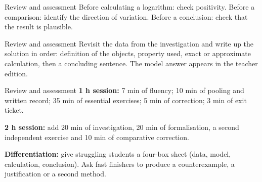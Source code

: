 \documentclass[aspectratio=169,10pt]{beamer}
\begin{document}
\begin{frame}{Review and assessment}
Before calculating a logarithm: check positivity. Before a comparison: identify the direction of variation. Before a conclusion: check that the result is plausible.
\end{frame}
\begin{frame}{Review and assessment}
Revisit the data from the investigation and write up the solution in order: definition of the objects, property used, exact or approximate calculation, then a concluding sentence. The model answer appears in the teacher edition.
\end{frame}
\begin{frame}{Review and assessment}
\textbf{1 h session:} 7 min of fluency; 10 min of pooling and written record; 35 min of essential exercises; 5 min of correction; 3 min of exit ticket.

\textbf{2 h session:} add 20 min of investigation, 20 min of formalisation, a second independent exercise and 10 min of comparative correction.

\textbf{Differentiation:} give struggling students a four-box sheet (data, model, calculation, conclusion). Ask fast finishers to produce a counterexample, a justification or a second method.
\end{frame}
\end{document}
